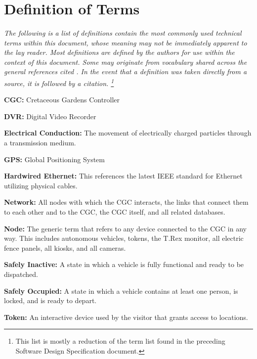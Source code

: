 \documentclass[12pt]{article}
\begin{document}
\section{Definition of Terms} \label{defs}
\paragraph{} \textit{The following is a list of definitions contain the most commonly used 
technical terms within this document, whose meaning may not be immediately apparent to the 
lay reader. Most definitions are defined by the authors for use within the context of this 
document. Some may originate from vocabulary shared across the general references cited \nocite{*}. 
In the event that a definition was taken directly from a source, it is followed by a citation.
\footnote{This list is mostly a reduction of the term list found in the preceding Software 
Design Specification document.}}

\begin{list}{}{}
    \item \textbf{CGC:} Cretaceous Gardens Controller 
    \item \textbf{DVR:} Digital Video Recorder
    \item \textbf{Electrical Conduction:} The movement of electrically charged particles through a transmission medium.
    \item \textbf{GPS:} Global Positioning System 
    \item \textbf{Hardwired Ethernet:} This references the latest IEEE standard for Ethernet utilizing physical cables.
    \item \textbf{Network:} All nodes with which the CGC interacts, the links that connect them to each other and to the CGC, the CGC itself, and all related databases.
    \item \textbf{Node:} The generic term that refers to any device connected to the CGC in any way. This includes autonomous vehicles, tokens, the T.Rex monitor, all electric fence panels, all kiosks, and all cameras.
    \item \textbf{Safely Inactive:} A state in which a vehicle is fully functional and ready to be dispatched.
    \item \textbf{Safely Occupied:} A state in which a vehicle contains at least one person, is locked, and is ready to depart.
    \item \textbf{Token:} An interactive device used by the visitor that grants access to locations.
\end{list}
\pagebreak

\end{document}
